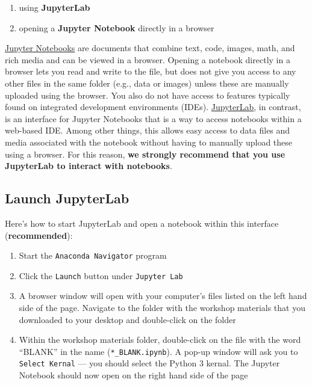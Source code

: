 \documentclass[
]{book}
\providecommand{\tightlist}{%
  \setlength{\itemsep}{0pt}\setlength{\parskip}{0pt}}
\begin{document}
\begin{enumerate}
\def\labelenumi{\arabic{enumi}.}
\tightlist
\item
  using \textbf{JupyterLab}
\item
  opening a \textbf{Jupyter Notebook} directly in a browser
\end{enumerate}

\href{https://jupyter-notebook.readthedocs.io/en/stable/}{Jupyter Notebooks} are documents that combine text, code, images, math, and rich media and can be viewed in a browser. Opening a notebook directly in a browser lets you read and write to the file, but does not give you access to any other files in the same folder (e.g., data or images) unless these are manually uploaded using the browser. You also do not have access to features typically found on integrated development environments (IDEs). \href{https://jupyterlab.readthedocs.io/en/stable/}{JupyterLab}, in contrast, is an interface for Jupyter Notebooks that is a way to access notebooks within a web-based IDE. Among other things, this allows easy access to data files and media associated with the notebook without having to manually upload these using a browser. For this reason, \textbf{we strongly recommend that you use JupyterLab to interact with notebooks}.

\hypertarget{launch-jupyterlab}{%
\subsection{Launch JupyterLab}\label{launch-jupyterlab}}

Here's how to start JupyterLab and open a notebook within this interface (\textbf{recommended}):

\begin{enumerate}
\def\labelenumi{\arabic{enumi}.}
\tightlist
\item
  Start the \texttt{Anaconda\ Navigator} program
\item
  Click the \texttt{Launch} button under \texttt{Jupyter\ Lab}
\item
  A browser window will open with your computer's files listed on the left hand side of the page. Navigate to the folder with the workshop materials that you downloaded to your desktop and double-click on the folder
\item
  Within the workshop materials folder, double-click on the file with the word ``BLANK'' in the name (\texttt{*\_BLANK.ipynb}). A pop-up window will ask you to \texttt{Select\ Kernal} --- you should select the Python 3 kernal. The Jupyter Notebook should now open on the right hand side of the page
\end{enumerate}
\end{document}

